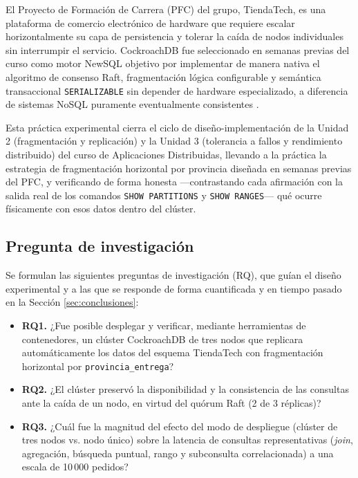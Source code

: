 \documentclass[10pt,letterpaper]{article}
\begin{document}
El Proyecto de Formación de Carrera (PFC) del grupo, TiendaTech, es una plataforma de comercio electrónico de hardware que requiere escalar horizontalmente su capa de persistencia y tolerar la caída de nodos individuales sin interrumpir el servicio. CockroachDB fue seleccionado en semanas previas del curso como motor NewSQL objetivo por implementar de manera nativa el algoritmo de consenso Raft, fragmentación lógica configurable y semántica transaccional \texttt{SERIALIZABLE} sin depender de hardware especializado, a diferencia de sistemas NoSQL puramente eventualmente consistentes \citep{taft2020cockroachdb}.

Esta práctica experimental cierra el ciclo de diseño-implementación de la Unidad 2 (fragmentación y replicación) y la Unidad 3 (tolerancia a fallos y rendimiento distribuido) del curso de Aplicaciones Distribuidas, llevando a la práctica la estrategia de fragmentación horizontal por provincia diseñada en semanas previas del PFC, y verificando de forma honesta —contrastando cada afirmación con la salida real de los comandos \texttt{SHOW PARTITIONS} y \texttt{SHOW RANGES}— qué ocurre físicamente con esos datos dentro del clúster.

\subsection{Pregunta de investigación}
Se formulan las siguientes preguntas de investigación (RQ), que guían el diseño experimental y a las que se responde de forma cuantificada y en tiempo pasado en la Sección \ref{sec:conclusiones}:

\begin{itemize}[leftmargin=*]
  \item \textbf{RQ1.} ¿Fue posible desplegar y verificar, mediante herramientas de contenedores, un clúster CockroachDB de tres nodos que replicara automáticamente los datos del esquema TiendaTech con fragmentación horizontal por \texttt{provincia\_entrega}?
  \item \textbf{RQ2.} ¿El clúster preservó la disponibilidad y la consistencia de las consultas ante la caída de un nodo, en virtud del quórum Raft (2 de 3 réplicas)?
  \item \textbf{RQ3.} ¿Cuál fue la magnitud del efecto del modo de despliegue (clúster de tres nodos vs. nodo único) sobre la latencia de consultas representativas (\textit{join}, agregación, búsqueda puntual, rango y subconsulta correlacionada) a una escala de 10\,000 pedidos?
\end{itemize}
\end{document}
